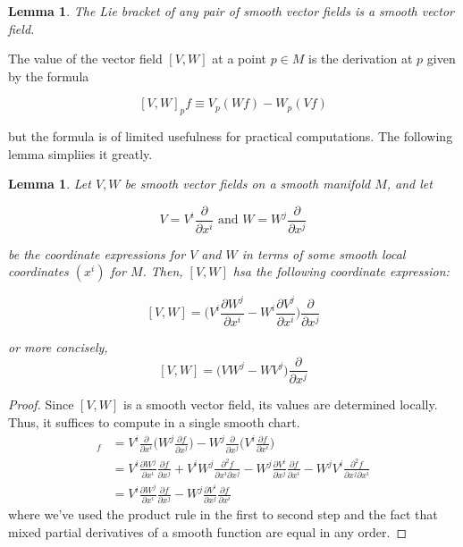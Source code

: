 \documentclass{article}
\newtheorem{lemma}[theorem]{Lemma}
\theoremstyle{remark}
\theoremstyle{definition}
\begin{document}
    \begin{lemma}
      The Lie bracket of any pair of smooth vector fields is a smooth vector field.
    \end{lemma}

    The value of the vector field $[V, W]$ at a point $p \in M$ is the derivation at $p$ given by the formula

      \[[V, W]_p f \equiv V_p (W f) - W_p (V f)\]

    but the formula is of limited usefulness for practical computations. The following lemma simpliies it greatly. 

    \begin{lemma}
      Let $V, W$ be smooth vector fields on a smooth manifold $M$, and let

        \[V = V^i \frac{\partial}{\partial x^i} \text{ and } W = W^j \frac{\partial}{\partial x^j}\]

      be the coordinate expressions for $V$ and $W$ in terms of some smooth local coordinates $(x^i)$ for $M$. Then, $[V, W]$ hsa the following coordinate expression: 

        \[[V, W] = \bigg( V^i \frac{\partial W^j}{\partial x^i} - W^i \frac{\partial V^j}{\partial x^i}\bigg) \frac{\partial}{\partial x^j}\]

      or more concisely, 
        \[[V, W] = \big(V W^j - W V^j \big) \frac{\partial}{\partial x^j}\]
    \end{lemma}
    \begin{proof}
      Since $[V, W]$ is a smooth vector field, its values are determined locally. Thus, it suffices to compute in a single smooth chart. 
      \begin{align*}
        [V,W]_f & = V^i \frac{\partial}{\partial x^i} \bigg( W^j \frac{\partial f}{\partial x^j} \bigg) - W^j \frac{\partial}{\partial x^j} \bigg( V^i \frac{\partial f}{\partial x^i} \bigg) \\
        & = V^i \frac{\partial W^j}{\partial x^i} \frac{\partial f}{\partial x^j} + V^i W^j \frac{\partial^2 f}{\partial x^i \partial x^j} - W^j \frac{\partial V^i}{\partial x^j} \frac{\partial f}{\partial x^i} - W^j V^i \frac{\partial^2 f}{\partial x^j \partial x^i} \\
        & = V^i \frac{\partial W^j}{\partial x^i} \frac{\partial f}{\partial x^j} - W^j \frac{\partial V^i}{\partial x^j} \frac{\partial f}{\partial x^i}
      \end{align*}
      where we've used the product rule in the first to second step and the fact that mixed partial derivatives of a smooth function are equal in any order. 
    \end{proof}
\end{document}
